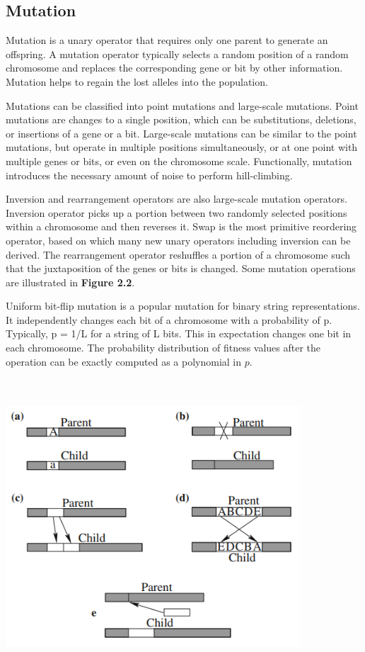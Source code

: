 \documentclass[14pt]{article}
\numberwithin{equation}{subsection}
\begin{document}
		\subsection{Mutation}Mutation is a unary operator that requires only one parent to generate an offspring.
		A mutation operator typically selects a random position of a random chromosome and replaces the corresponding
		gene or bit by other information. Mutation helps to regain the lost alleles into the population. \par
		Mutations can be classified into point mutations and large-scale mutations. Point mutations are changes to a
		single position, which can be substitutions, deletions, or insertions of a gene or a bit. Large-scale mutations
		can be similar to the point mutations, but operate in multiple positions simultaneously, or at one point with
		multiple genes or bits, or even on the chromosome scale. Functionally, mutation introduces the necessary amount
		of noise to perform hill-climbing. \par
		Inversion and rearrangement operators are also large-scale mutation operators. Inversion operator picks up a
		portion between two randomly selected positions within a chromosome and then reverses it. Swap is the most
		primitive reordering operator, based on which many new unary operators including inversion can be derived. The
		rearrangement operator reshuffles a portion of a chromosome such that the juxtaposition of the genes or bits is
		changed. Some mutation operations are illustrated in \textbf{Figure 2.2}. \par
		Uniform bit-flip mutation is a popular mutation for binary string representations. It independently changes
		each bit of a chromosome with a probability of p. Typically, p = 1/L for a string of L bits. This in
		expectation changes one bit in each chromosome. The probability distribution of fitness values after the
		operation can be exactly computed as a polynomial in $p$.
		
		
		\begin{center}
				\includegraphics[width=11cm, height=11cm]{mutation_figure2-2.PNG}
		\end{center}
		
\end{document}

